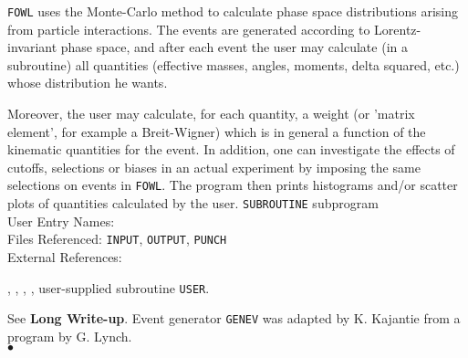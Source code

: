                               
                             
\Submitter{}                                
                      
{\tt FOWL} uses the Monte-Carlo method to calculate phase space
distributions arising from particle interactions. The events are
generated according to Lorentz-invariant phase space, and after each
event the user may calculate (in a subroutine) all quantities
(effective masses, angles, moments, delta squared, etc.)
whose distribution he wants.
\par
Moreover, the user may calculate, for each quantity, a weight
(or 'matrix element', for example a Breit-Wigner) which is in general a
function of the kinematic quantities for the event. In addition, one can
investigate the effects of cutoffs, selections or biases in an actual
experiment by imposing the same selections on events in {\tt FOWL}.
The program then prints histograms and/or scatter plots of quantities
calculated by the user.
\Structure
{\tt SUBROUTINE} subprogram \\
User Entry Names: \\
Files Referenced: {\tt INPUT}, {\tt OUTPUT}, {\tt PUNCH}\\
External References:
\parbox[t]{105mm}{
, ,
, ,
user-supplied subroutine {\tt USER}.}
\Usage
See {\bf Long Write-up}.
\Source
Event generator {\tt GENEV} was adapted by K. Kajantie from a program
by G.  Lynch.
\\ $\bullet$
